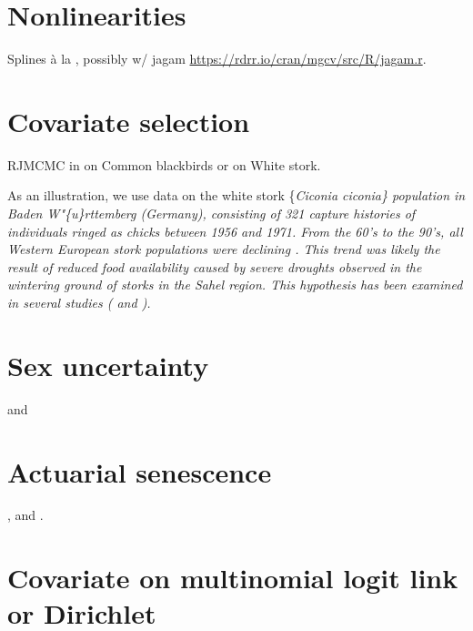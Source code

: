 \documentclass[
  12pt,
]{krantz}
\begin{document}
\hypertarget{nonlinearities}{%
\section{Nonlinearities}\label{nonlinearities}}

Splines à la \citet{gimenez_semiparametric_2006}, possibly w/ jagam \url{https://rdrr.io/cran/mgcv/src/R/jagam.r}.

\hypertarget{covariate-selection}{%
\section{Covariate selection}\label{covariate-selection}}

RJMCMC in \citet{gimenez2009fitness} on Common blackbirds or \citet{gimenez2009winbugs} on White stork.

As an illustration, we use data on the white stork \{\it Ciconia ciconia\} population in Baden W"\{u\}rttemberg (Germany), consisting of 321 capture histories of individuals ringed as chicks between 1956 and 1971. From the 60's to the 90's, all Western European stork populations were declining \citet{bair91}. This trend was likely the result of reduced food availability \citet{schau05} caused by severe droughts observed in the wintering ground of storks in the Sahel region. This hypothesis has been examined in several studies (\citet{kanya90} and \citet{barb99}).

\hypertarget{sex-uncertainty}{%
\section{Sex uncertainty}\label{sex-uncertainty}}

\citet{pradel2008sex} and \citet{genovart_exploiting_2012}

\hypertarget{actuarial-senescence}{%
\section{Actuarial senescence}\label{actuarial-senescence}}

\citet{choquet_semi-markov_2011}, \citet{peron_evidence_2016} and \citet{marzo2011}.

\hypertarget{covariate-on-multinomial-logit-link-or-dirichlet}{%
\section{Covariate on multinomial logit link or Dirichlet}\label{covariate-on-multinomial-logit-link-or-dirichlet}}
\end{document}
